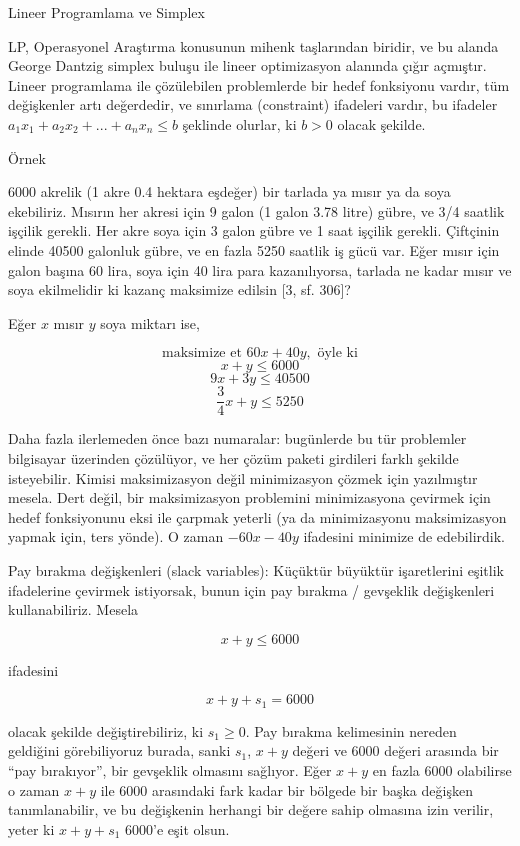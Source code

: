 \documentclass[12pt,fleqn]{article}\usepackage{../../common}
\begin{document}
Lineer Programlama ve Simplex

LP, Operasyonel Araştırma konusunun mihenk taşlarından biridir, ve bu alanda
George Dantzig simplex buluşu ile lineer optimizasyon alanında çığır açmıştır.
Lineer programlama ile çözülebilen problemlerde bir hedef fonksiyonu vardır, tüm
değişkenler artı değerdedir, ve sınırlama (constraint) ifadeleri vardır, bu
ifadeler $a_1x_1 + a_2x_2 + ... + a_nx_n \le b$ şeklinde olurlar, ki $b > 0$
olacak şekilde.

Örnek

6000 akrelik (1 akre 0.4 hektara eşdeğer) bir tarlada ya mısır ya da soya
ekebiliriz. Mısırın her akresi için 9 galon (1 galon 3.78 litre) gübre, ve 3/4
saatlik işçilik gerekli. Her akre soya için 3 galon gübre ve 1 saat işçilik
gerekli. Çiftçinin elinde 40500 galonluk gübre, ve en fazla 5250 saatlik iş gücü
var. Eğer mısır için galon başına 60 lira, soya için 40 lira para kazanılıyorsa,
tarlada ne kadar mısır ve soya ekilmelidir ki kazanç maksimize edilsin [3,
  sf. 306]?

Eğer $x$ mısır $y$ soya miktarı ise, 

$$ \textrm{maksimize et  } 60x + 40y, \textrm{ öyle ki} $$ 
$$ x + y \le 6000 $$
$$ 9x + 3y \le 40500 $$
$$ \frac{3}{4}x + y \le 5250 $$ 

Daha fazla ilerlemeden önce bazı numaralar: bugünlerde bu tür problemler
bilgisayar üzerinden çözülüyor, ve her çözüm paketi girdileri farklı
şekilde isteyebilir. Kimisi maksimizasyon değil minimizasyon çözmek için
yazılmıştır mesela. Dert değil, bir maksimizasyon problemini minimizasyona
çevirmek için hedef fonksiyonunu eksi ile çarpmak yeterli (ya da
minimizasyonu maksimizasyon yapmak için, ters yönde). O zaman $-60x - 40y$
ifadesini minimize de edebilirdik.

Pay bırakma değişkenleri (slack variables): Küçüktür büyüktür işaretlerini
eşitlik ifadelerine çevirmek istiyorsak, bunun için pay bırakma / gevşeklik
değişkenleri kullanabiliriz. Mesela

$$ x + y \le 6000 $$

ifadesini

$$ x + y + s_1 = 6000 $$

olacak şekilde değiştirebiliriz, ki $s_1 \ge 0$. Pay bırakma kelimesinin nereden
geldiğini görebiliyoruz burada, sanki $s_1$, $x+y$ değeri ve 6000 değeri
arasında bir ``pay bırakıyor'', bir gevşeklik olmasını sağlıyor. Eğer $x+y$ en
fazla 6000 olabilirse o zaman $x+y$ ile 6000 arasındaki fark kadar bir bölgede
bir başka değişken tanımlanabilir, ve bu değişkenin herhangi bir değere sahip
olmasına izin verilir, yeter ki $x+y+s_1$ 6000'e eşit olsun.
\end{document}
